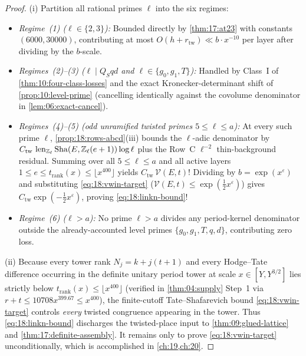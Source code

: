 
\begin{proof}
(i) Partition all rational primes $\ell$ into the six regimes:
\begin{itemize}
\item \emph{Regime~(1) ($\ell \in \{2, 3\}$):} Bounded directly by \cref{thm:17:at23} with constants $(6000, 30000)$, contributing at most $O(h + r_{\mathrm{tw}}) \ll b \cdot x^{-10}$ per layer after dividing by the $b$-scale.
\item \emph{Regimes~(2)--(3) ($\ell \mid Q_S q d$ and $\ell \in \{g_0, g_1, T\}$):} Handled by Class~I of \cref{thm:10:four-class-losses} and the exact Kronecker-determinant shift of \cref{prop:10:level-prime} (cancelling identically against the covolume denominator in \cref{lem:06:exact-cancel}).
\item \emph{Regimes~(4)--(5) (odd unramified twisted primes $5 \le \ell \le a$):} At every such prime $\ell$, \cref{prop:18:rows-abcd}(iii) bounds the $\ell$-adic denominator by $C_{\mathrm{tw}}\,\operatorname{len}_{\mathbb{Z}_\ell}\mathrm{Sha}(E, \mathbb{Z}_\ell(e+1))\log\ell$ plus the Row~C $\ell^{-2}$ thin-background residual. Summing over all $5 \le \ell \le a$ and all active layers $1 \le e \le t_{\mathrm{rank}}(x) \le \lfloor x^{400}\rfloor$ yields $C_{\mathrm{tw}}\,\mathcal{V}(E, t)$! Dividing by $b = \exp(x^\varepsilon)$ and substituting \eqref{eq:18:vwin-target} ($\mathcal{V}(E, t) \le \exp(\frac{1}{2}x^\varepsilon)$) gives $C_{\mathrm{tw}}\exp(-\frac{1}{2}x^\varepsilon)$, proving \eqref{eq:18:linkn-bound}!
\item \emph{Regime~(6) ($\ell > a$):} No prime $\ell > a$ divides any period-kernel denominator outside the already-accounted level primes $\{g_0, g_1, T, q, d\}$, contributing zero loss.
\end{itemize}

(ii) Because every tower rank $N_j = k + j(t+1)$ and every Hodge--Tate difference occurring in the definite unitary period tower at scale $x \in [Y, Y^{3/2}]$ lies strictly below $t_{\mathrm{rank}}(x) \le \lfloor x^{400}\rfloor$ (verified in \cref{thm:04:supply} Step~1 via $r + t \le 10708 x^{399.67} \le x^{400}$), the finite-cutoff Tate--Shafarevich bound \eqref{eq:18:vwin-target} controls \emph{every} twisted congruence appearing in the tower. Thus \eqref{eq:18:linkn-bound} discharges the twisted-place input to \cref{thm:09:glued-lattice} and \cref{thm:17:definite-assembly}. It remains only to prove \eqref{eq:18:vwin-target} unconditionally, which is accomplished in \cref{ch:19,ch:20}.
\end{proof}
